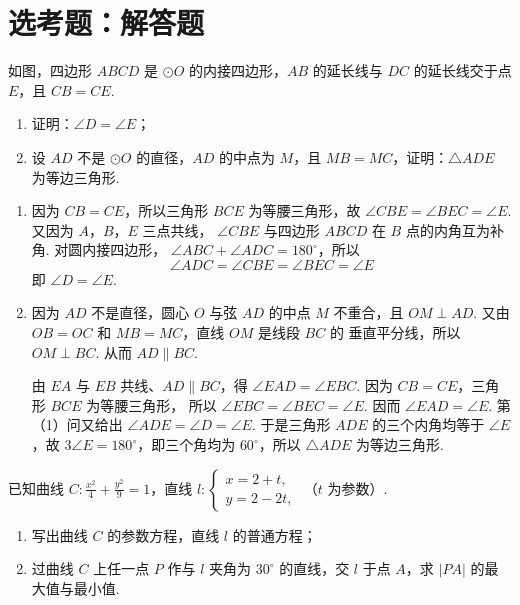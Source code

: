 \section{选考题：解答题}

\begin{problem}
如图，四边形 \(ABCD\) 是 \(\odot O\) 的内接四边形，\(AB\) 的延长线与 \(DC\) 的延长线交于点 \(E\)，且 \(CB = CE\).

\begin{enumerate}
\item 证明：\(\angle D = \angle E\)；
\item 设 \(AD\) 不是 \(\odot O\) 的直径，\(AD\) 的中点为 \(M\)，且 \(MB = MC\)，证明：\(\triangle ADE\) 为等边三角形.
\end{enumerate}

\FloatBarrier
\end{problem}

\begin{solution}
\begin{enumerate}
\item 因为 \(CB=CE\)，所以三角形 \(BCE\) 为等腰三角形，故
\(\angle CBE=\angle BEC=\angle E\). 又因为 \(A\)，\(B\)，\(E\) 三点共线，
\(\angle CBE\) 与四边形 \(ABCD\) 在 \(B\) 点的内角互为补角. 对圆内接四边形，
\(\angle ABC+\angle ADC=180^{\circ}\)，所以
\[
\angle ADC=\angle CBE=\angle BEC=\angle E
\]
即 \(\angle D=\angle E\).

\item 因为 \(AD\) 不是直径，圆心 \(O\) 与弦 \(AD\) 的中点 \(M\) 不重合，且
\(OM\perp AD\). 又由 \(OB=OC\) 和 \(MB=MC\)，直线 \(OM\) 是线段 \(BC\) 的
垂直平分线，所以 \(OM\perp BC\). 从而
\(AD\parallel BC\).

由 \(EA\) 与 \(EB\) 共线、\(AD\parallel BC\)，得
\(\angle EAD=\angle EBC\). 因为 \(CB=CE\)，三角形 \(BCE\) 为等腰三角形，
所以 \(\angle EBC=\angle BEC=\angle E\). 因而
\(\angle EAD=\angle E\). 第（1）问又给出
\(\angle ADE=\angle D=\angle E\). 于是三角形 \(ADE\) 的三个内角均等于
\(\angle E\)，故
\(3\angle E=180^{\circ}\)，即三个角均为 \(60^{\circ}\)，所以
\(\triangle ADE\) 为等边三角形.
\end{enumerate}
\end{solution}

\begin{problem}
已知曲线 \(C: \frac{x^2}{4} + \frac{y^2}{9} = 1\)，直线 \(l: \begin{cases}
x = 2 + t,\\
y = 2 - 2t,
\end{cases}\) （\(t\) 为参数）.

\begin{enumerate}
\item 写出曲线 \(C\) 的参数方程，直线 \(l\) 的普通方程；
\item 过曲线 \(C\) 上任一点 \(P\) 作与 \(l\) 夹角为 \(30^{\circ}\) 的直线，交 \(l\) 于点 \(A\)，求 \(|PA|\) 的最大值与最小值.
\end{enumerate}
\end{problem}

